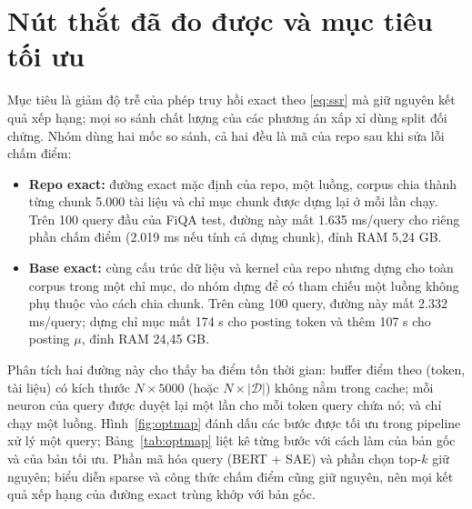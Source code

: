 \documentclass[a4paper,13pt]{extreport}
\theoremstyle{plain}
\begin{document}
\section{Nút thắt đã đo được và mục tiêu tối ưu}
\label{sec:opt-where}
Mục tiêu là giảm độ trễ của phép truy hồi exact theo \eqref{eq:ssr} mà giữ nguyên kết quả xếp hạng; mọi so sánh chất lượng của các phương án xấp xỉ dùng split đối chứng. Nhóm dùng hai mốc so sánh, cả hai đều là mã của repo sau khi sửa lỗi chấm điểm:
\begin{itemize}[leftmargin=1.5cm]
  \item \textbf{Repo exact:} đường exact mặc định của repo, một luồng, corpus chia thành từng chunk 5.000 tài liệu và chỉ mục chunk được dựng lại ở mỗi lần chạy. Trên 100 query đầu của FiQA test, đường này mất 1.635 ms/query cho riêng phần chấm điểm (2.019 ms nếu tính cả dựng chunk), đỉnh RAM 5,24 GB.
  \item \textbf{Base exact:} cùng cấu trúc dữ liệu và kernel của repo nhưng dựng cho toàn corpus trong một chỉ mục, do nhóm dựng để có tham chiếu một luồng không phụ thuộc vào cách chia chunk. Trên cùng 100 query, đường này mất 2.332 ms/query; dựng chỉ mục mất 174 s cho posting token và thêm 107 s cho posting $\mu$, đỉnh RAM 24,45 GB.
\end{itemize}
Phân tích hai đường này cho thấy ba điểm tốn thời gian: buffer điểm theo (token, tài liệu) có kích thước $N\times 5000$ (hoặc $N\times|\mathcal{D}|$) không nằm trong cache; mỗi neuron của query được duyệt lại một lần cho mỗi token query chứa nó; và chỉ chạy một luồng. Hình~\ref{fig:optmap} đánh dấu các bước được tối ưu trong pipeline xử lý một query; Bảng~\ref{tab:optmap} liệt kê từng bước với cách làm của bản gốc và của bản tối ưu. Phần mã hóa query (BERT + SAE) và phần chọn top-$k$ giữ nguyên; biểu diễn sparse và công thức chấm điểm cũng giữ nguyên, nên mọi kết quả xếp hạng của đường exact trùng khớp với bản gốc.
\end{document}
